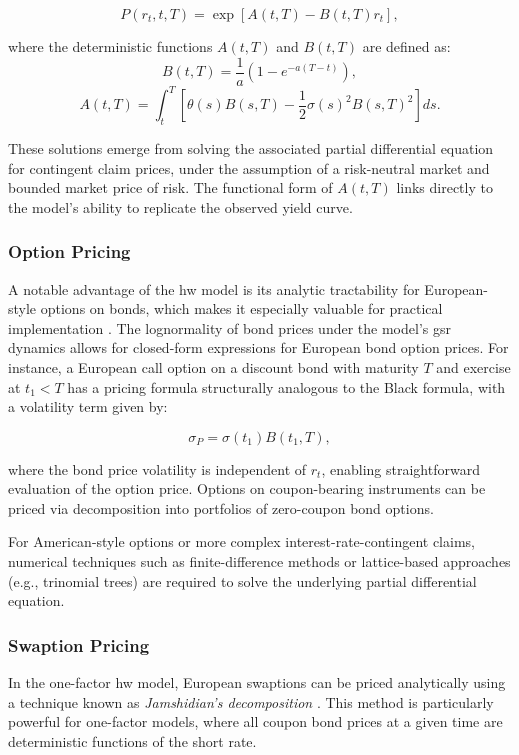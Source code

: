 \begin{equation}
	P(r_t, t, T) = \exp\left[ A(t, T) - B(t, T) r_t \right],
\end{equation}

where the deterministic functions \( A(t, T) \) and \( B(t, T) \) are defined as:
\begin{equation}
	B(t, T) = \frac{1}{a} \left(1 - e^{-a(T - t)}\right),
\end{equation}
\begin{equation}
	A(t, T) = \int_t^T \left[ \theta(s) B(s, T) - \frac{1}{2} \sigma(s)^2 B(s, T)^2 \right] ds.
\end{equation}

These solutions emerge from solving the associated partial differential equation for contingent claim prices, under the assumption of a risk-neutral market and bounded market price of risk. The functional form of \( A(t, T) \) links directly to the model's ability to replicate the observed yield curve.

\subsubsection{Option Pricing}
A notable advantage of the \ac{hw} model is its analytic tractability for European-style options on bonds, which makes it especially valuable for practical implementation \parencite[p.~72]{brigo2006interest}. The lognormality of bond prices under the model's \ac{gsr} dynamics allows for closed-form expressions for European bond option prices. For instance, a European call option on a discount bond with maturity \( T \) and exercise at \( t_1 < T \) has a pricing formula structurally analogous to the Black formula, with a volatility term given by:

\begin{equation}
	\sigma_P = \sigma(t_1) B(t_1, T),
\end{equation}

where the bond price volatility is independent of \( r_t \), enabling straightforward evaluation of the option price. Options on coupon-bearing instruments can be priced via decomposition into portfolios of zero-coupon bond options.

For American-style options or more complex interest-rate-contingent claims, numerical techniques such as finite-difference methods or lattice-based approaches (e.g., trinomial trees) are required to solve the underlying partial differential equation.

\subsubsection{Swaption Pricing} \label{swaption_pricing}
In the one-factor \ac{hw} model, European swaptions can be priced analytically using a technique known as \textit{Jamshidian's decomposition} \parencite{jamshidian1989decomposition}. This method is particularly powerful for one-factor models, where all coupon bond prices at a given time are deterministic functions of the short rate.

